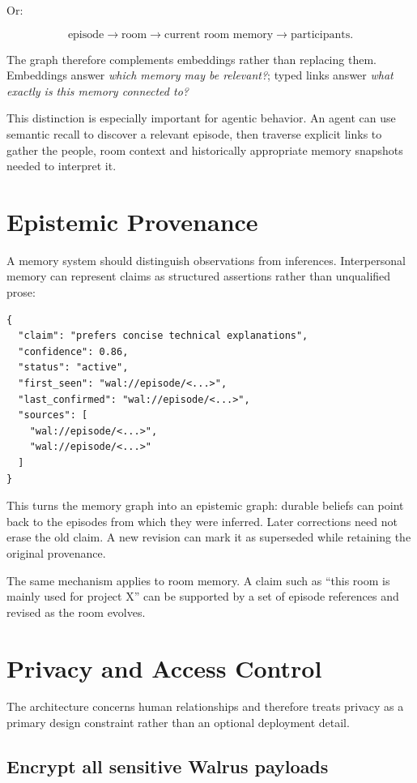 \documentclass[11pt]{article}
\begin{document}
Or:

\[
\text{episode}
\rightarrow \text{room}
\rightarrow \text{current room memory}
\rightarrow \text{participants}.
\]

The graph therefore complements embeddings rather than replacing them. Embeddings answer \emph{which memory may be relevant?}; typed links answer \emph{what exactly is this memory connected to?}

This distinction is especially important for agentic behavior. An agent can use semantic recall to discover a relevant episode, then traverse explicit links to gather the people, room context and historically appropriate memory snapshots needed to interpret it.

\section{Epistemic Provenance}

A memory system should distinguish observations from inferences. Interpersonal memory can represent claims as structured assertions rather than unqualified prose:

\begin{lstlisting}
{
  "claim": "prefers concise technical explanations",
  "confidence": 0.86,
  "status": "active",
  "first_seen": "wal://episode/<...>",
  "last_confirmed": "wal://episode/<...>",
  "sources": [
    "wal://episode/<...>",
    "wal://episode/<...>"
  ]
}
\end{lstlisting}

This turns the memory graph into an epistemic graph: durable beliefs can point back to the episodes from which they were inferred. Later corrections need not erase the old claim. A new revision can mark it as superseded while retaining the original provenance.

The same mechanism applies to room memory. A claim such as ``this room is mainly used for project X'' can be supported by a set of episode references and revised as the room evolves.

\section{Privacy and Access Control}

The architecture concerns human relationships and therefore treats privacy as a primary design constraint rather than an optional deployment detail.

\subsection{Encrypt all sensitive Walrus payloads}
\end{document}
